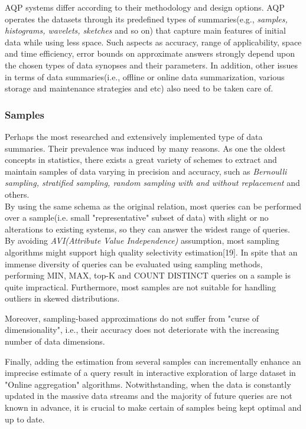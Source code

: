 \documentclass[10pt, conference, compsocconf]{IEEEtran}
\begin{document}
AQP systems differ according to their methodology and design options. AQP operates the datasets through its predefined types of summaries(e.g., \textit{samples, histograms, wavelets, sketches} and so on) that capture main features of initial data while using less space. Such aspects as accuracy, range of applicability, space and time efficiency, error bounds on approximate answers strongly depend upon the chosen types of data synopses and their parameters. In addition, other issues in terms of data summaries(i.e., offline or online data summarization, various storage and maintenance strategies and etc) also need to be taken care of.\\

\subsubsection{\textbf{Samples}}

Perhaps the most researched and extensively implemented type of data summaries. Their prevalence was induced by many reasons. As one the oldest concepts in statistics, there exists a great variety of schemes to extract and maintain samples of data varying in precision and accuracy, such as \textit{Bernoulli sampling, stratified sampling, random sampling with and without replacement} and others. \\
By using the same schema as the original relation, most queries can be performed over a sample(i.e. small "representative" subset of data) with slight or no alterations to existing systems, so they can answer the widest range of queries. By avoiding \textit{AVI(Attribute Value Independence)} assumption, most sampling algorithms might support high quality selectivity estimation[19]. In spite that an immense diversity of queries can be evaluated using sampling methods, performing MIN, MAX, top-K and COUNT DISTINCT queries on a sample is quite impractical. Furthermore, most samples are not suitable for handling outliers in skewed distributions. 

Moreover, sampling-based approximations do not suffer from "curse of dimensionality", i.e., their accuracy does not deteriorate with the increasing number of data dimensions. 

Finally, adding the estimation from several samples can incrementally enhance an imprecise estimate of a query result in interactive exploration of large dataset in "Online aggregation" algorithms. Notwithstanding, when the data is constantly updated in the massive data streams and the majority of future queries are not known in advance, it is crucial to make certain of samples being kept optimal and up to date. \\
\end{document}
